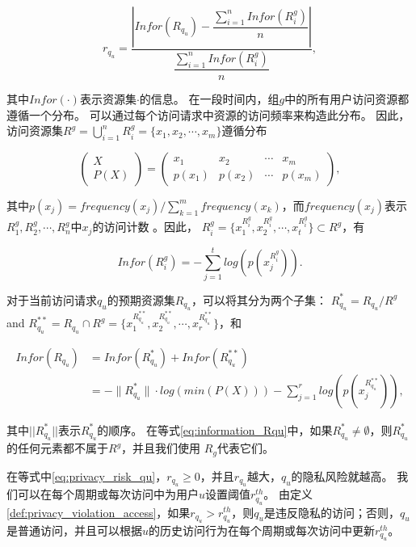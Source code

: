 \begin{equation}\label{eq:privacy_risk_qu}
r_{q_u} = \dfrac{|Infor(R_{q_u})-\dfrac{\sum ^{n}_{i=1} Infor(R^g_i)}{n}|}{\dfrac{\sum ^{n}_{i=1} Infor(R^g_i)}{n}}, 
\end{equation}

其中$Infor(\cdot)$表示资源集$\cdot$的信息。 在一段时间内，组$g$中的所有用户访问资源都遵循一个分布。 可以通过每个访问请求中资源的访问频率来构造此分布。 因此，访问资源集$R^g = \bigcup _{i=1}^n R^g_i=\{x_1, x_2, \cdots, x_m\}$遵循分布

\begin{equation}\label{eq:distribution_Rg}
\left(
\begin{array}{c}
X \\ P(X)
\end{array}
\right)
=\left(
\begin{array}{cccccccccc}
x_1 &  x_2 & \cdots & x_m
\\ p(x_1) &  p(x_2) & \cdots & p(x_m)
\end{array}
\right),
\end{equation}

其中$p(x_j)=frequency(x_j)/\sum_{k=1}^m frequency(x_k)$，而$frequency(x_j)$表示$R^g_1, R^g_2, \cdots, R^g_n$中$x_j$的访问计数 。因此， $R^g_i =\{x_1^{R^g_i},x_2^{R^g_i},\cdots, x_t^{R^g_i}\} \subset R^g$，有

\begin{equation}\label{eq:information_Rgi}
Infor(R^g_i)=-\sum_{j=1}^t log(p(x_j^{R^g_i})).
\end{equation}


对于当前访问请求$q_u$的预期资源集$R_{q_u}$，可以将其分为两个子集： $R_{q_u}^* = R_{q_u}/R^g$ and $R_{q_u}^{**} = R_{q_u} \cap R^g = \{x_1^{R_{q_u}^{**}},x_2^{R_{q_u}^{**}},\cdots, x_r^{R_{q_u}^{**}}\}$，和

\begin{equation}\label{eq:information_Rqu}
\begin{split}
Infor(R_{q_u})&=Infor(R_{q_u}^{*})  +Infor(R_{q_u}^{**})
\\&=-\|R_{q_u}^*\|\cdot log(min(P(X)))-\sum_{j=1}^r log(p(x_j^{R_{q_u}^{**}})),
\end{split}
\end{equation}

其中$||R_{q_u}^*||$表示$R_{q_u}^*$的顺序。 在等式\ref{eq:information_Rqu}中，如果$R_{q_u}^* \neq \emptyset$，则$R_{q_u}^*$的任何元素都不属于$R^g$，并且我们使用 $R_g$代表它们。

在等式中\ref{eq:privacy_risk_qu}，$r_{q_u} \geq 0$，并且$r_{q_u}$越大，$q_u$的隐私风险就越高。 我们可以在每个周期或每次访问中为用户$u$设置阈值$r_{q_u}^{th}$。 由定义\ref{def:privacy_violation_access}，如果$r_{q_u} > r_{q_u}^{th}$，则$q_u$是违反隐私的访问；否则，$q_u$是普通访问，并且可以根据$u$的历史访问行为在每个周期或每次访问中更新$r_{q_u}^{th}$。

